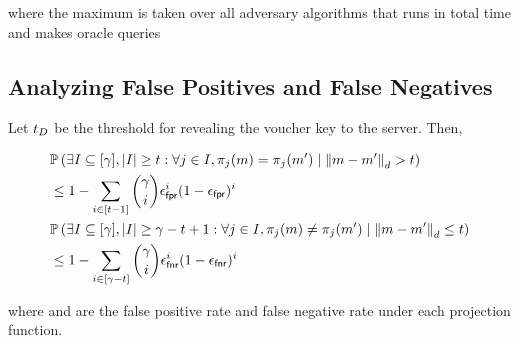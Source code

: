 
\noindent
where the maximum is taken over all adversary algorithms
\indsrAdversaryComb that runs in total time \timeBound and makes
\oracleQueries oracle queries
\fi 

\iffalse 
\subsection{Analyzing False Positives and False Negatives}
\label{sec:fpr_analysis}

\begin{theorem}
Let $t_{D}$ be the threshold for revealing the voucher key to the server. Then, 

		
		\begin{small}
		\begin{align}
			& \cprob{}{\exists I \subseteq \nats[\numProjections], \setSize{I} \ge \threshold: \forall \projIdx \in I, 
				\projFn[\projIdx](\genericMetricSpaceElmt) = \projFn[\projIdx](\genericMetricSpaceElmtAlt)}{\distanceNotation[\distance][\genericMetricSpaceElmt][\genericMetricSpaceElmtAlt] > 
			\threshold} \nonumber \\ 
& \le 1 - \sum\limits_{i \in \nats[\threshold - 1]} \binom{\numProjections}{i} \fpr^{i} (1 - \fpr)^{i}
 \\
			& \cprob{}{\exists I \subseteq \nats[\numProjections], \setSize{I} \ge \numProjections - \threshold + 1: \forall \projIdx \in I, 
				\projFn[\projIdx](\genericMetricSpaceElmt) \neq \projFn[\projIdx](\genericMetricSpaceElmtAlt)}{\distanceNotation[\distance][\genericMetricSpaceElmt][\genericMetricSpaceElmtAlt] \le 
			\threshold} \nonumber \\ 
& \le 1 - \sum\limits_{i \in \nats[\numProjections - \threshold]} \binom{\numProjections}{i} \fnr^{i} (1 - \fnr)^{i}
 \\
		\end{align}
		\end{small}
where \fpr and \fnr are the false positive rate and false negative rate under each projection function.

\end{theorem}

